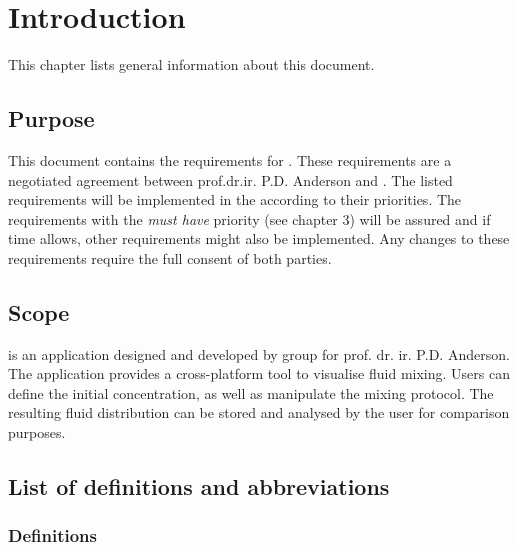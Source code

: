 \chapter{Introduction}
This chapter lists general information about this document.

\section{Purpose}
This document contains the requirements for \projectname. These requirements are a negotiated agreement between prof.dr.ir. P.D. Anderson and \projectauthor. The listed requirements will be implemented in the \applicationname according to their priorities. The requirements with the \emph{must have} priority (see chapter 3) will be assured and if time allows, other requirements might also be implemented. Any changes to these requirements require the full consent of both parties.

\section{Scope}
\projectname is an application designed and developed by \projectauthor group for prof. dr. ir. P.D. Anderson. The application provides a cross-platform tool to visualise fluid mixing. Users can define the initial concentration, as well as manipulate the mixing protocol. The resulting fluid distribution can be stored and analysed by the user for comparison purposes. \\


\section{List of definitions and abbreviations}
\subsection{Definitions}

